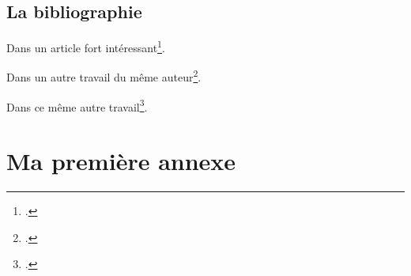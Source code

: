 \documentclass[12pt,a4paper]{book} %
\begin{document}


\section{La bibliographie}

Dans un article fort intéressant\footcite[Le voici:][p.\,42]{ailes_anglo-norman_2008}.

Dans un autre travail du même auteur\footcite{ailes_fierabras_2002}.

Dans ce même autre travail\footcite{ailes_fierabras_2002}.


\printbibliography

\appendix

\chapter{Ma première annexe}

\backmatter
\printindex

\listoffigures
\listoftables


\tableofcontents
\end{document}
